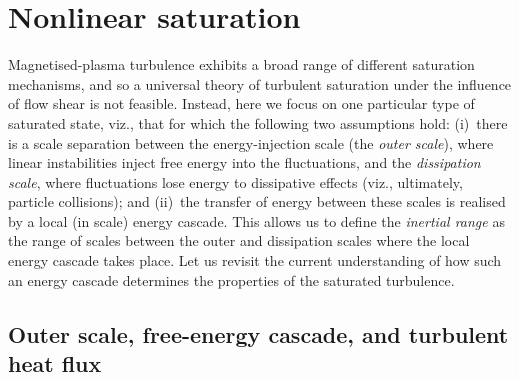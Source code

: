 \documentclass{jpp}
\begin{document}
\section{Nonlinear saturation}
\label{sec:nonlinear_saturation}

Magnetised-plasma turbulence exhibits a broad range of different saturation mechanisms, and so a universal theory of turbulent saturation under the influence of flow shear is not feasible. Instead, here we focus on one particular type of saturated state, viz., that for which the following two assumptions hold: (i)~there is a scale separation between the energy-injection scale (the \textit{outer scale}), where linear instabilities inject free energy into the fluctuations, and the \textit{dissipation scale}, where fluctuations lose energy to dissipative effects (viz., ultimately, particle collisions); and (ii)~the transfer of energy between these scales is realised by a local (in scale) energy cascade. This allows us to define the \textit{inertial range} as the range of scales between the outer and dissipation scales where the local energy cascade takes place. Let us revisit the current understanding of how such an energy cascade determines the properties of the saturated turbulence.

\subsection{Outer scale, free-energy cascade, and turbulent heat flux}
\label{sec:energy_cascade}
\end{document}
